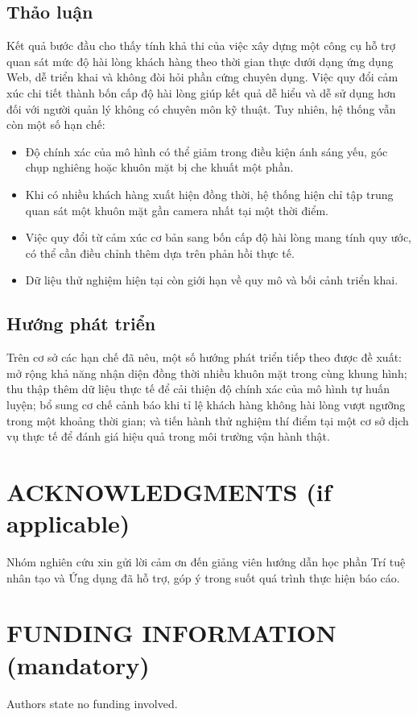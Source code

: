 \documentclass{iaesarticle}
\begin{document}
\subsection{Thảo luận}
Kết quả bước đầu cho thấy tính khả thi của việc xây dựng một công cụ hỗ trợ quan sát mức độ hài lòng khách hàng theo thời gian thực dưới dạng ứng dụng Web, dễ triển khai và không đòi hỏi phần cứng chuyên dụng. Việc quy đổi cảm xúc chi tiết thành bốn cấp độ hài lòng giúp kết quả dễ hiểu và dễ sử dụng hơn đối với người quản lý không có chuyên môn kỹ thuật. Tuy nhiên, hệ thống vẫn còn một số hạn chế:
\begin{itemize}[topsep=0.3ex, itemsep=0.3ex, parsep=0.2ex]
	\item[-] Độ chính xác của mô hình có thể giảm trong điều kiện ánh sáng yếu, góc chụp nghiêng hoặc khuôn mặt bị che khuất một phần.
	\item[-] Khi có nhiều khách hàng xuất hiện đồng thời, hệ thống hiện chỉ tập trung quan sát một khuôn mặt gần camera nhất tại một thời điểm.
	\item[-] Việc quy đổi từ cảm xúc cơ bản sang bốn cấp độ hài lòng mang tính quy ước, có thể cần điều chỉnh thêm dựa trên phản hồi thực tế.
	\item[-] Dữ liệu thử nghiệm hiện tại còn giới hạn về quy mô và bối cảnh triển khai.
\end{itemize}

\subsection{Hướng phát triển}
Trên cơ sở các hạn chế đã nêu, một số hướng phát triển tiếp theo được đề xuất: mở rộng khả năng nhận diện đồng thời nhiều khuôn mặt trong cùng khung hình; thu thập thêm dữ liệu thực tế để cải thiện độ chính xác của mô hình tự huấn luyện; bổ sung cơ chế cảnh báo khi tỉ lệ khách hàng không hài lòng vượt ngưỡng trong một khoảng thời gian; và tiến hành thử nghiệm thí điểm tại một cơ sở dịch vụ thực tế để đánh giá hiệu quả trong môi trường vận hành thật.

\section*{ACKNOWLEDGMENTS (if applicable)}
\label{}
Nhóm nghiên cứu xin gửi lời cảm ơn đến giảng viên hướng dẫn học phần Trí tuệ nhân tạo và Ứng dụng đã hỗ trợ, góp ý trong suốt quá trình thực hiện báo cáo.

\section*{FUNDING INFORMATION (mandatory)}
\label{}
Authors state no funding involved.
\end{document}
